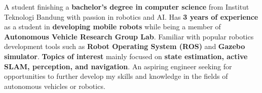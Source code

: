 

\begin{cvparagraph}
A student finishing a \textbf{bachelor's degree in computer science} from Institut Teknologi Bandung with passion in robotics and AI. Has \textbf{3 years of experience} as a student in \textbf{developing mobile robots} while being a member of \textbf{Autonomous Vehicle Research Group Lab}. Familiar with popular robotics development tools such as \textbf{Robot Operating System (ROS)} and \textbf{Gazebo simulator}. \textbf{Topics of interest} mainly focused on \textbf{state estimation, active SLAM, perception, and navigation}. An aspiring engineer seeking for opportunities to further develop my skills and knowledge in the fields of autonomous vehicles or robotics.
\end{cvparagraph}
